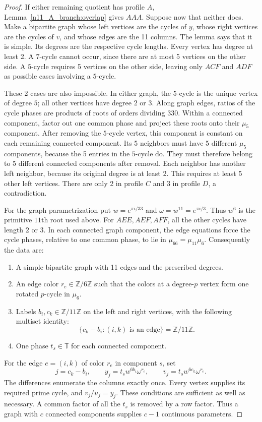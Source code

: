 \documentclass[11pt,a4paper]{article}
\numberwithin{equation}{section}
\begin{document}
\begin{proof}
If either remaining quotient has profile $A$, Lemma~\ref{n11_A_branch:overlap} gives $AAA$. Suppose now that neither does. Make a bipartite graph whose left vertices are the cycles of $y$, whose right vertices are the cycles of $v$, and whose edges are the 11 columns. The lemma says that it is simple. Its degrees are the respective cycle lengths. Every vertex has degree at least 2. A $7$-cycle cannot occur, since there are at most 5 vertices on the other side. A $5$-cycle requires 5 vertices on the other side, leaving only $ACF$ and $ADF$ as possible cases involving a $5$-cycle.

These 2 cases are also impossible. In either graph, the $5$-cycle is the unique vertex of degree $5$; all other vertices have degree $2$ or $3$. Along graph edges, ratios of the cycle phases are products of roots of orders dividing $330$. Within a connected component, factor out one common phase and project these roots onto their $\mu_5$ component. After removing the $5$-cycle vertex, this component is constant on each remaining connected component. Its 5 neighbors must have 5 different $\mu_5$ components, because the 5 entries in the $5$-cycle do. They must therefore belong to 5 different connected components after removal. Each neighbor has another left neighbor, because its original degree is at least 2. This requires at least 5 other left vertices. There are only 2 in profile $C$ and 3 in profile $D$, a contradiction. 

\medskip
For the graph parametrization put $w=e^{\pi i/33}$ and $\omega=w^{11}=e^{\pi i/3}$. Thus $w^6$ is the primitive $11$th root used above. For $AEE,AEF,AFF$, all the other cycles have length $2$ or $3$. In each connected graph component, the edge equations force the cycle phases, relative to one common phase, to lie in $\mu_{66}=\mu_{11}\mu_6$. Consequently the data are:
\begin{enumerate}
\item A simple bipartite graph with 11 edges and the prescribed degrees.
\item An edge color $r_e\in\mathbb{Z}/6\mathbb{Z}$ such that the colors at a degree-$p$ vertex form one rotated $p$-cycle in $\mu_6$.
\item Labels $b_i,c_k\in\mathbb{Z}/11\mathbb{Z}$ on the left and right vertices, with the following multiset identity:
$$\{c_k-b_i:(i,k)\text{ is an edge}\}=\mathbb{Z}/11\mathbb{Z}.$$
\item One phase $t_s\in\mathbb{T}$ for each connected component.
\end{enumerate}
For the edge $e=(i,k)$ of color $r_e$ in component $s$, set
$$j=c_k-b_i,\qquad y_j=t_sw^{6b_i}\omega^{r_e},\qquad v_j=t_sw^{6c_k}\omega^{r_e}.$$
The differences enumerate the columns exactly once. Every vertex supplies its required prime cycle, and $v_j/u_j=y_j$. These conditions are sufficient as well as necessary. A common factor of all the $t_s$ is removed by a row factor. Thus a graph with $c$ connected components supplies $c-1$ continuous parameters.


\end{proof}
\end{document}
